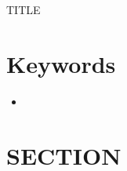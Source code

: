 \documentclass[letterpaper]{article}
\begin{document}
    \begin{center}
        \Large
        TITLE

    \end{center}

    \tableofcontents
    \newpage

    \setcounter{section}{-1}

    \section{Keywords}
    \begin{itemize}
        \item 

    \end{itemize}

    \section{SECTION}
\end{document}
